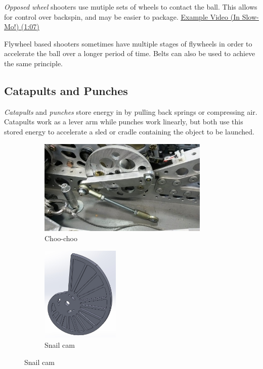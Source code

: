 \documentclass[10pt,letterpaper]{book}
\begin{document}
\textit{Opposed wheel} shooters use mutiple sets of wheels to contact the ball. This allows for control over backspin, and may be easier to package. \href{https://youtu.be/pgMU_AxzxAE?t=67}{\color{red}\underline{Example Video (In Slow-Mo!) (1:07)}}

Flywheel based shooters sometimes have multiple stages of flywheels in order to accelerate the ball over a longer period of time. Belts can also be used to achieve the same principle.
\subsection{Catapults and Punches}
\textit{Catapults} and \textit{punches} store energy in by pulling back springs or compressing air. Catapults work as a lever arm while punches work linearly, but both use this stored energy to accelerate a sled or cradle containing the object to be launched.

\begin{figure}[H]
\begin{subfigure}[b]{.32\linewidth}
	\includegraphics[height=1.8in]{imgs/choo_choo.jpeg}
	\caption{Choo-choo}
\end{subfigure}\begin{subfigure}[b]{.32\linewidth}
	\includegraphics[height=1.8in]{imgs/snail_cam.jpeg}
	\caption{Snail cam}
\end{subfigure}
\end{figure}
\end{document}

